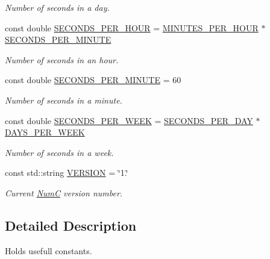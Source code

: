 \begin{DoxyCompactItemize}
\begin{DoxyCompactList}\small\item\em Number of seconds in a day. \end{DoxyCompactList}\item 
const double \mbox{\hyperlink{namespace_num_c_1_1_constants_a5090dc3b19761dcf8c008b1ee54d2936}{S\+E\+C\+O\+N\+D\+S\+\_\+\+P\+E\+R\+\_\+\+H\+O\+UR}} = \mbox{\hyperlink{namespace_num_c_1_1_constants_ad866f0ac14005c8c3e2a09f396a3aab3}{M\+I\+N\+U\+T\+E\+S\+\_\+\+P\+E\+R\+\_\+\+H\+O\+UR}} $\ast$ \mbox{\hyperlink{namespace_num_c_1_1_constants_af8489b57825b7d3355fd0e3da0e4ad62}{S\+E\+C\+O\+N\+D\+S\+\_\+\+P\+E\+R\+\_\+\+M\+I\+N\+U\+TE}}
\begin{DoxyCompactList}\small\item\em Number of seconds in an hour. \end{DoxyCompactList}\item 
const double \mbox{\hyperlink{namespace_num_c_1_1_constants_af8489b57825b7d3355fd0e3da0e4ad62}{S\+E\+C\+O\+N\+D\+S\+\_\+\+P\+E\+R\+\_\+\+M\+I\+N\+U\+TE}} = 60
\begin{DoxyCompactList}\small\item\em Number of seconds in a minute. \end{DoxyCompactList}\item 
const double \mbox{\hyperlink{namespace_num_c_1_1_constants_abb1ba6ca939e4a4872c904e9cb624300}{S\+E\+C\+O\+N\+D\+S\+\_\+\+P\+E\+R\+\_\+\+W\+E\+EK}} = \mbox{\hyperlink{namespace_num_c_1_1_constants_a0679151e1b64bb3d5a0d005893a4fe3e}{S\+E\+C\+O\+N\+D\+S\+\_\+\+P\+E\+R\+\_\+\+D\+AY}} $\ast$ \mbox{\hyperlink{namespace_num_c_1_1_constants_af5a30002b60b03726aa0049a6e065270}{D\+A\+Y\+S\+\_\+\+P\+E\+R\+\_\+\+W\+E\+EK}}
\begin{DoxyCompactList}\small\item\em Number of seconds in a week. \end{DoxyCompactList}\item 
const std\+::string \mbox{\hyperlink{namespace_num_c_1_1_constants_ad96b4bc765d8bc8e27f23fa7717bf4c1}{V\+E\+R\+S\+I\+ON}} = \char`\"{}1.\char`\"{}
\begin{DoxyCompactList}\small\item\em Current \mbox{\hyperlink{namespace_num_c}{NumC}} version number. \end{DoxyCompactList}\end{DoxyCompactItemize}


\subsection{Detailed Description}
Holds usefull constants. 

